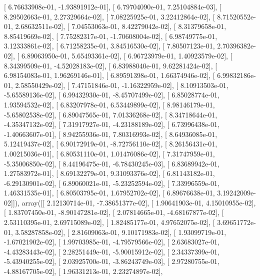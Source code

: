 \documentclass{article}
\begin{document}
       [  6.76633908e-01,  -1.93891912e-01],
       [  6.79704090e-01,   7.25104884e-03],
       [  8.29502663e-01,   2.27329664e-02],
       [  7.08225925e-01,   3.22412864e-02],
       [  8.71520552e-01,   2.68632511e-02],
       [  7.04553063e-01,   8.42279042e-02],
       [  8.31379658e-01,   8.85419669e-02],
       [  7.75282317e-01,  -1.70608004e-02],
       [  6.98749775e-01,   3.12333861e-02],
       [  6.71258235e-01,   3.84516530e-02],
       [  7.80507123e-01,   2.70396382e-02],
       [  6.89063950e-01,   5.65493361e-02],
       [  6.96723979e-01,   1.40923579e-02],
       [  8.34399509e-01,  -4.52028183e-02],
       [  6.83988040e-01,   9.62281424e-02],
       [  6.98154083e-01,   1.96269146e-01],
       [  6.89591398e-01,   1.66374946e-02],
       [  6.99832186e-01,   2.58550429e-02],
       [  7.47151846e-01,  -1.16322959e-02],
       [  8.10913503e-01,  -5.65589136e-02],
       [  6.99432930e-01,  -8.45707499e-02],
       [  6.85028774e-01,   1.93594532e-02],
       [  6.83207978e-01,   6.53449899e-02],
       [  8.98146179e-01,  -5.65802538e-02],
       [  6.89047565e-01,   7.01336268e-02],
       [  8.34718644e-01,  -4.35347132e-02],
       [  7.31917927e-01,  -4.23188189e-02],
       [  6.73996438e-01,  -1.40663607e-01],
       [  8.94255936e-01,   7.80316993e-02],
       [  8.64936085e-01,   5.12419437e-02],
       [  6.90172919e-01,  -8.72756110e-02],
       [  8.26156431e-01,   1.00215036e-01],
       [  6.80531110e-01,   1.01476086e-02],
       [  7.31747959e-01,  -5.35006850e-02],
       [  8.44196475e-01,  -6.78430245e-03],
       [  6.83689942e-01,   1.27583972e-01],
       [  8.69132279e-01,   9.31093376e-02],
       [  6.81143182e-01,  -6.29130901e-02],
       [  6.89060021e-01,  -5.23252594e-02],
       [  7.33996559e-01,   1.46331535e-01],
       [  6.80503795e-01,   1.67952702e-02],
       [  6.89676638e-01,   3.19242009e-02]]), array([[  2.12130714e-01,  -7.38651377e-02],
       [  1.90641903e-01,   4.15010955e-02],
       [  1.83707450e-01,  -8.90147281e-02],
       [  2.07814665e-01,  -4.68167877e-02],
       [  2.53110395e-01,   2.69715089e-02],
       [  1.82485177e-01,   4.97652075e-02],
       [  3.69651772e-01,   3.58287858e-02],
       [  2.81609063e-01,   9.10171983e-02],
       [  1.93099719e-01,  -1.67021902e-02],
       [  1.99703985e-01,  -4.79579566e-02],
       [  2.63683027e-01,  -4.43283443e-02],
       [  2.28251449e-01,  -5.90015912e-02],
       [  2.34337399e-01,  -5.43940255e-02],
       [  2.03925700e-01,  -3.86243749e-03],
       [  2.97280755e-01,  -4.88167705e-02],
       [  1.96331213e-01,   2.23274897e-02],
\end{document}
